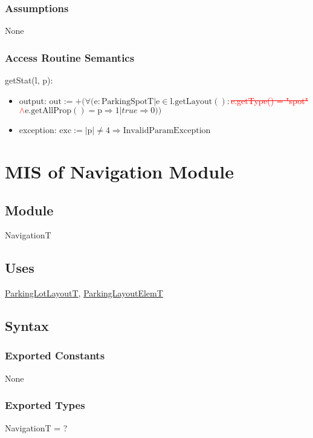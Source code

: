 \documentclass[12pt, titlepage]{article}
\begin{document}
\subsubsection{Assumptions}
None

\subsubsection{Access Routine Semantics}

\noindent getStat(l, p):
\begin{itemize} 
\item output: $\text{out} := +(\forall (\text{e} : \text{ParkingSpotT} |
\text{e} \in \text{l}.\text{getLayout}() : $\textcolor{red}{\st{e.getType() =
"spot" $\land$}}$ \text{e}.\text{getAllProp}() = \text{p} \Rightarrow \text{1} |
true \Rightarrow 0))$
\item exception: $\text{exc} := |\text{p}| \neq 4 \Rightarrow
\text{InvalidParamException}$
\end{itemize}

\newpage

\section{MIS of Navigation Module} 
\label{navigation:Module}

\subsection{Module}
NavigationT

\subsection{Uses}
\hyperref[parkingLotLayout:Module]{ParkingLotLayoutT}, 
\hyperref[parkingLayoutElem:Module]{ParkingLayoutElemT}

\subsection{Syntax}

\subsubsection{Exported Constants}
None

\subsubsection{Exported Types}
NavigationT = ?
\end{document}
